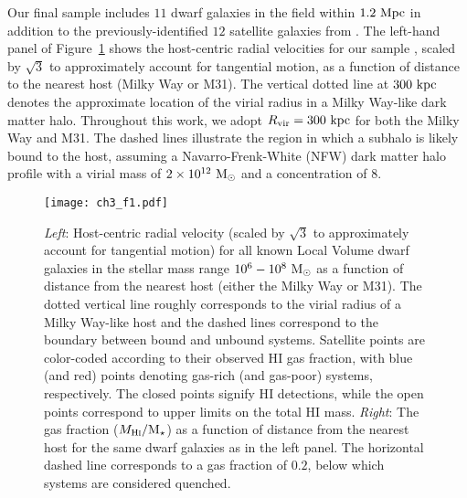 Our final sample includes $11$ dwarf galaxies in the field within
$1.2~{\rm Mpc}$ in addition to the previously-identified $12$
satellite galaxies from \citet{fham15}.
%
The left-hand panel of Figure~\ref{fig:LVdwarfs} shows the host-centric
radial velocities for our sample \citep{mcconnachie12, tollerud12,
  makarova17}, scaled by $\sqrt{3}$ to approximately account for
tangential motion, as a function of distance to the nearest host
(Milky Way or M31). 
%
The vertical dotted line at $300~{\rm kpc}$ denotes the approximate location of
the virial radius in a Milky Way-like dark matter halo. Throughout this work, we
adopt $R_{\rm{vir}} = 300~{\rm kpc}$ for both the Milky Way and M31.
%
The dashed lines illustrate the region in which a subhalo is likely
bound to the host, assuming a Navarro-Frenk-White (NFW) dark matter
halo profile \citep{nfw97} with a virial mass of $2\times
10^{12}~{\rm M}_{\odot}$ and a concentration of $8$. 
%


\begin{figure*}
 \centering
 \hspace*{-0.3in}
 \texttt{[image: ch3\_f1.pdf]}
 \caption{{\it Left}: Host-centric radial velocity (scaled by
   $\sqrt{3}$ to approximately account for tangential motion) for all
   known Local Volume dwarf galaxies in the stellar mass range
   $10^{6}-10^{8}~{\rm M}_{\odot}$ as a function of distance from the nearest
   host (either the Milky Way or M31). The dotted vertical line
   roughly corresponds to the virial radius of a Milky Way-like host
   and the dashed lines correspond to the boundary between bound and
   unbound systems. Satellite points are color-coded according to
   their observed H{\scriptsize I} gas fraction, with blue (and red)
   points denoting gas-rich (and gas-poor) systems, respectively. 
   The closed points signify H{\scriptsize I} detections, while the
   open points correspond to upper limits on the 
   total H{\scriptsize I} mass. {\it Right}: The gas fraction
   ($M_{\rm H\protect\scalebox{0.55}{\rm I}}/\mstar$) as a function of distance
   from the nearest host for the same dwarf galaxies as in the left
   panel. The horizontal dashed line corresponds to a gas fraction of
   $0.2$, below which systems are considered quenched.}
 \label{fig:LVdwarfs}
\end{figure*}





